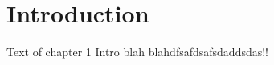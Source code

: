 \chapter{Introduction} \label{chapter:introduction}
Text of chapter 1 Intro blah blahdfsafdsafsdaddsdas!!